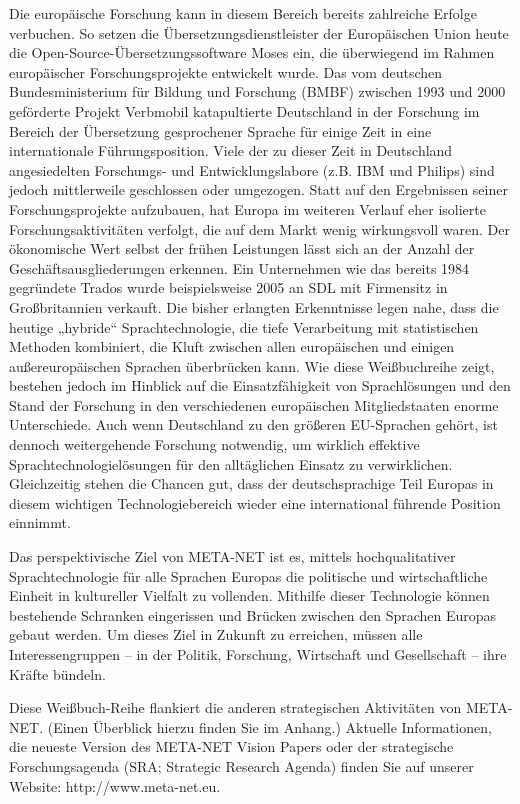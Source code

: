 \documentclass[]{../../metanetpaper}
\begin{document}
\begin{Parallel}[c]{80mm}{80mm}
{Die europäische Forschung kann in diesem Bereich bereits zahlreiche Erfolge verbuchen. So setzen die Übersetzungsdienstleister der Europäischen Union heute die Open-Source-Übersetzungssoftware Moses ein, die überwiegend im Rahmen europäischer Forschungsprojekte entwickelt wurde. Das vom deutschen Bundesministerium für Bildung und Forschung (BMBF) zwischen 1993 und 2000 geförderte Projekt Verbmobil katapultierte Deutschland in der Forschung im Bereich der Übersetzung gesprochener Sprache für einige Zeit in eine internationale Führungsposition. Viele der zu dieser Zeit in Deutschland angesiedelten Forschungs- und Entwicklungslabore (z.B. IBM und Philips) sind jedoch mittlerweile geschlossen oder umgezogen. Statt auf den Ergebnissen seiner Forschungsprojekte aufzubauen, hat Europa im weiteren Verlauf eher isolierte Forschungsaktivitäten verfolgt, die auf dem Markt wenig wirkungsvoll waren. Der ökonomische Wert selbst der frühen Leistungen lässt sich an der Anzahl der Geschäftsausgliederungen erkennen. Ein Unternehmen wie das bereits 1984 gegründete Trados wurde beispielsweise 2005 an SDL mit Firmensitz in Großbritannien verkauft.
Die bisher erlangten Erkenntnisse legen nahe, dass die heutige „hybride“ Sprachtechnologie, die tiefe Verarbeitung mit statistischen Methoden kombiniert, die Kluft zwischen allen europäischen und einigen außereuropäischen Sprachen überbrücken kann. Wie diese Weißbuchreihe zeigt, bestehen jedoch im Hinblick auf die Einsatzfähigkeit von Sprachlösungen und den Stand der Forschung in den verschiedenen europäischen Mitgliedstaaten enorme Unterschiede. Auch wenn Deutschland zu den größeren EU-Sprachen gehört, ist dennoch weitergehende Forschung notwendig, um wirklich effektive Sprachtechnologielösungen für den alltäglichen Einsatz zu verwirklichen. Gleichzeitig stehen die Chancen gut, dass der deutschsprachige Teil Europas in diesem wichtigen Technologiebereich wieder eine international führende Position einnimmt. 

Das perspektivische Ziel von META-NET ist es, mittels hochqualitativer Sprachtechnologie für alle Sprachen Europas die politische und wirtschaftliche Einheit in kultureller Vielfalt zu vollenden. Mithilfe dieser Technologie können bestehende Schranken eingerissen und Brücken zwischen den Sprachen Europas gebaut werden. Um dieses Ziel in Zukunft zu erreichen, müssen alle Interessengruppen – in der Politik, Forschung, Wirtschaft und Gesellschaft – ihre Kräfte bündeln.

Diese Weißbuch-Reihe flankiert die anderen strategischen Aktivitäten von META-NET. (Einen Überblick hierzu finden Sie im Anhang.) Aktuelle Informationen, die neueste Version des META-NET Vision Papers\cite{Meta1} oder der strategische Forschungsagenda (SRA; Strategic Research Agenda) finden Sie auf unserer Website: http://www.meta-net.eu.
  }
  

\end{Parallel}
\end{document}
